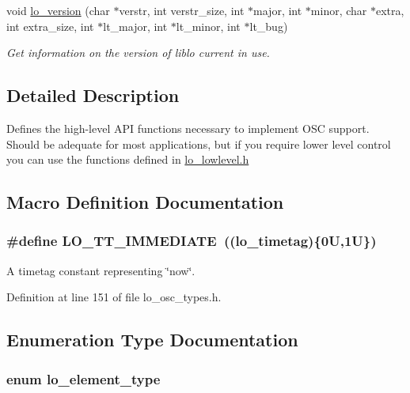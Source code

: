\begin{DoxyCompactItemize}
void \hyperlink{group__liblo_gad9fa9a716b9df6b60357ea05e6c5f87b}{lo\+\_\+version} (char $\ast$verstr, int verstr\+\_\+size, int $\ast$major, int $\ast$minor, char $\ast$extra, int extra\+\_\+size, int $\ast$lt\+\_\+major, int $\ast$lt\+\_\+minor, int $\ast$lt\+\_\+bug)
\begin{DoxyCompactList}\small\item\em Get information on the version of liblo current in use. \end{DoxyCompactList}\end{DoxyCompactItemize}


\subsection{Detailed Description}
Defines the high-\/level A\+P\+I functions necessary to implement O\+S\+C support. Should be adequate for most applications, but if you require lower level control you can use the functions defined in \hyperlink{lo__lowlevel_8h}{lo\+\_\+lowlevel.\+h} 

\subsection{Macro Definition Documentation}
\hypertarget{group__liblo_gafa8cfc08b763b0c039fb64a73c4c77da}{
\subsubsection[{L\+O\+\_\+\+T\+T\+\_\+\+I\+M\+M\+E\+D\+I\+A\+T\+E}]{\setlength{\rightskip}{0pt plus 5cm}\#define L\+O\+\_\+\+T\+T\+\_\+\+I\+M\+M\+E\+D\+I\+A\+T\+E~(({\bf lo\+\_\+timetag})\{0\+U,1\+U\})}}\label{group__liblo_gafa8cfc08b763b0c039fb64a73c4c77da}


A timetag constant representing \char`\"{}now\char`\"{}. 



Definition at line 151 of file lo\+\_\+osc\+\_\+types.\+h.



\subsection{Enumeration Type Documentation}
\hypertarget{group__liblo_ga08432d01f2b8f4a32ffa58992a821f28}{
\subsubsection[{lo\+\_\+element\+\_\+type}]{\setlength{\rightskip}{0pt plus 5cm}enum {\bf lo\+\_\+element\+\_\+type}}}\label{group__liblo_ga08432d01f2b8f4a32ffa58992a821f28}



